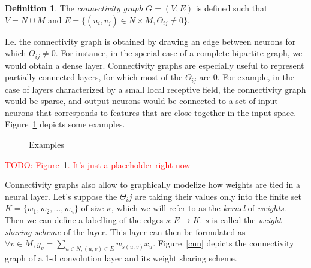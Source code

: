 \documentclass{article}
\theoremstyle{definition}
\newtheorem{definition}{Definition}[section]
\newcommand{\todo}[1]{\textcolor{red}{TODO: #1}}
\begin{document}
\begin{definition}
{The \emph{connectivity graph} $G = (V,E)$ is defined such that $V = N \cup M$ and $E = \{(u_i,v_j) \in  N \times M, \Theta_{ij} \neq 0 \} $.}
\end{definition}

I.e. the connectivity graph is obtained by drawing an edge between neurons for which $\Theta_{ij} \neq 0$.
For instance, in the special case of a complete bipartite graph, we would obtain a dense layer. 
Connectivity graphs are especially useful to represent partially connected layers, for which most of the $\Theta_{ij}$ are $0$. 
For example, in the case of layers characterized by a small local receptive field, the connectivity graph would be sparse, and output neurons would be connected to a set of input neurons that corresponds to features that are close together in the input space. Figure~\ref{con_ex} depicts some examples.

\begin{figure}[h]
  \begin{center}
  \end{center}
  \caption{Examples}
  \label{con_ex}
\end{figure}

\todo{Figure~\ref{con_ex}. It's just a placeholder right now}


Connectivity graphs also allow to graphically modelize how weights are tied in a neural layer. Let's suppose the $\Theta_ij$ are taking their values only into the finite set $K = \{w_1, w_2, \ldots, w_\kappa\}$ of size $\kappa$, which we will refer to as the \emph{kernel} of \emph{weights}. Then we can define a labelling of the edges $s: E \rightarrow K$. $s$ is called the \emph{weight sharing scheme} of the layer. This layer can then be formulated as $\displaystyle \forall v \in M, y_v = \sum_{u \in N, (u,v) \in E} w_{s(u,v)} x_u$. Figure~\ref{cnn} depicts the connectivity graph of a 1-d convolution layer and its weight sharing scheme.
\end{document}
